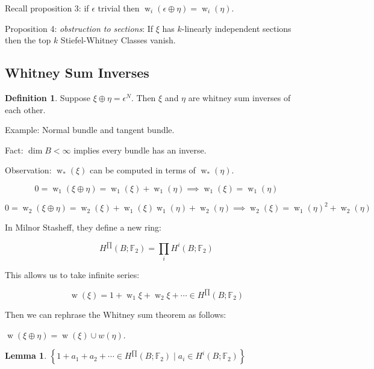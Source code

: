 \documentclass{article}
\theoremstyle{definition}
\newtheorem*{definition}{Definition}
\newtheorem{lemma}[theorem]{Lemma}
\begin{document}
    Recall proposition 3: if \(\epsilon\) trivial then \(\operatorname{w}_i(\epsilon \oplus \eta) = \operatorname{w}_i(\eta)\).

    Proposition 4: \textit{obstruction to sections}: If \(\xi\) has \(k\)-linearly independent sections then the top \(k\) Stiefel-Whitney Classes vanish.

    \subsection*{Whitney Sum Inverses}

    \begin{definition}
        Suppose \(\xi \oplus \eta = \epsilon^N\). Then \(\xi\) and \(\eta\) are whitney sum inverses of each other.
        
        Example: Normal bundle and tangent bundle.
    \end{definition}

    Fact: \(\dim B < \infty\) implies every bundle has an inverse.

    Observation: \(\operatorname{w}_{\ast} (\xi)\) can be computed in terms of \(\operatorname{w}_{\ast} (\eta)\).

    \[
        0 = \operatorname{w}_1(\xi \oplus \eta) = \operatorname{w}_1(\xi) + \operatorname{w}_1 (\eta) \implies \operatorname{w}_1(\xi) = \operatorname{w}_1(\eta)
    \]
    
    \[
        0 = \operatorname{w}_2(\xi \oplus \eta) = \operatorname{w}_2(\xi) + \operatorname{w}_1(\xi) \operatorname{w}_1(\eta) + \operatorname{w}_2(\eta) \implies \operatorname{w}_2(\xi) = \operatorname{w}_1(\eta)^2 + \operatorname{w}_2(\eta)
    \]

    In Milnor Stasheff, they define a new ring:

    \[
        H^{\prod}  (B;\mathbb{F}_2) = \prod_i H^i(B;\mathbb{F}_2)
    \]

    This allows us to take infinite series:

    \[
        \operatorname{w}(\xi) = 1 + \operatorname{w}_1 \xi + \operatorname{w}_2 \xi + \cdots \in H^{\prod}  (B;\mathbb{F}_2)
    \]

    Then we can rephrase the Whitney sum theorem as follows:

    \(\operatorname{w}(\xi \oplus \eta) = \operatorname{w}(\xi) \cup w(\eta)\).

    \begin{lemma}
        \(\left\{ 1 + a_1 + a_2 + \cdots \in H^{\prod} (B;\mathbb{F}_2) \mid a_i \in H^i(B;\mathbb{F}_2) \right\}\)
    \end{lemma}
\end{document}
